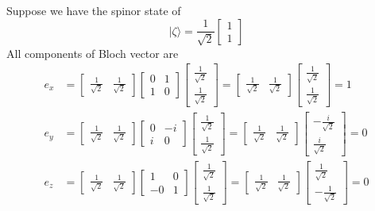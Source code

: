 \documentclass[../../../main.tex]{subfiles}
\begin{document}
Suppose we have the spinor state of
\begin{equation*}
    |\zeta\rangle = \frac{1}{\sqrt{2}} \begin{bmatrix}
        1 \\
        1
    \end{bmatrix}
\end{equation*}
All components of Bloch vector are
\begin{align*}
    e_x & =
    \begin{bmatrix}
        \frac{1}{\sqrt{2}} & \frac{1}{\sqrt{2}}
    \end{bmatrix}
    \begin{bmatrix} 0 & 1 \\ 1 & 0 \end{bmatrix}
    \begin{bmatrix} \frac{1}{\sqrt{2}} \\ \frac{1}{\sqrt{2}} \end{bmatrix} =
    \begin{bmatrix}
        \frac{1}{\sqrt{2}} & \frac{1}{\sqrt{2}}
    \end{bmatrix}
    \begin{bmatrix}
        \frac{1}{\sqrt{2}} \\ \frac{1}{\sqrt{2}}
    \end{bmatrix}
    = 1     \\
    e_y & =
    \begin{bmatrix}
        \frac{1}{\sqrt{2}} & \frac{1}{\sqrt{2}}
    \end{bmatrix}
    \begin{bmatrix} 0 & -i \\ i & 0 \end{bmatrix}
    \begin{bmatrix} \frac{1}{\sqrt{2}} \\ \frac{1}{\sqrt{2}} \end{bmatrix} =
    \begin{bmatrix}
        \frac{1}{\sqrt{2}} & \frac{1}{\sqrt{2}}
    \end{bmatrix}
    \begin{bmatrix}
        -\frac{i}{\sqrt{2}} \\ \frac{i}{\sqrt{2}}
    \end{bmatrix}
    = 0     \\
    e_z & =
    \begin{bmatrix}
        \frac{1}{\sqrt{2}} & \frac{1}{\sqrt{2}}
    \end{bmatrix}
    \begin{bmatrix} 1 & 0 \\ -0 & 1 \end{bmatrix}
    \begin{bmatrix} \frac{1}{\sqrt{2}} \\ \frac{1}{\sqrt{2}} \end{bmatrix} =
    \begin{bmatrix}
        \frac{1}{\sqrt{2}} & \frac{1}{\sqrt{2}}
    \end{bmatrix}
    \begin{bmatrix}
        \frac{1}{\sqrt{2}} \\ -\frac{1}{\sqrt{2}}
    \end{bmatrix}
    = 0
\end{align*}
\end{document}
